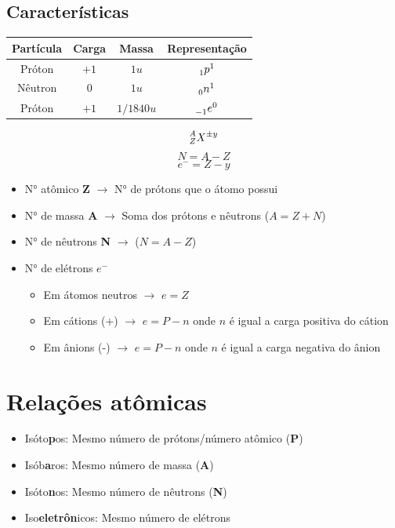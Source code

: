 \documentclass{article}
\begin{document}
\subsection{Características}
\begin{tabular}{||c|c|c|c||}
    \hline
    Partícula & Carga & Massa & Representação \\
    \hline
    \hline
    Próton & $+1$ & $1u$ & $ \prescript{}{1}{p}^1 $ \\
    Nêutron & $0$ & $1u$ & $ \prescript{}{0}{n}^1 $ \\
    Próton & $+1$ & $1/1840u$ & $ \prescript{}{-1}{e}^0 $ \\
    \hline
    \hline
\end{tabular}
\begin{equation}
    \prescript{A}{Z}{X}^{\pm y}
\end{equation}
\begin{equation}
    N = A - Z
\end{equation}
\begin{equation}
    e^- = Z - y
\end{equation}
\begin{itemize}
    \item N° atômico \textbf{Z} $\rightarrow$ N° de prótons que o átomo possui
    \item N° de massa \textbf{A} $\rightarrow$ Soma dos prótons e nêutrons ($ A = Z + N $)
    \item N° de nêutrons \textbf{N} $\rightarrow$ ($ N = A - Z $)
    \item N° de elétrons \textbf{$ e^- $}
    \begin{itemize}
        \item Em átomos neutros $\rightarrow$ $ e = Z $
        \item Em cátions (+) $\rightarrow$ $ e = P - n $ onde $ n $ é igual a carga positiva do cátion
        \item Em ânions (-) $\rightarrow$ $ e = P - n $ onde $ n $ é igual a carga negativa do ânion
    \end{itemize}
\end{itemize}

\section{Relações atômicas}
\begin{itemize}
    \item Isóto\textbf{p}os: Mesmo número de prótons/número atômico (\textbf{P})
    \item Isób\textbf{a}ros: Mesmo número de massa (\textbf{A})
    \item Isóto\textbf{n}os: Mesmo número de nêutrons (\textbf{N})
    \item Iso\textbf{eletrôn}icos: Mesmo número de elétrons
\end{itemize}
\end{document}
